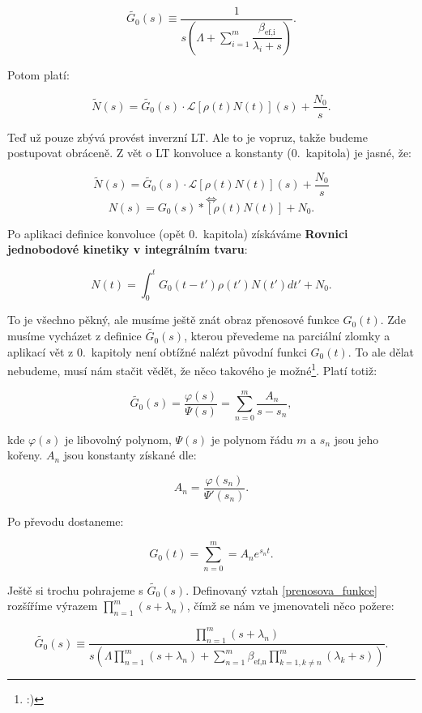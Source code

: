 \begin{equation}
  \boxed{
  \tilde{G_0}(s) \equiv \dfrac{1}{s \left ( \Lambda + \sum_{i=1}^m \dfrac{\beta_{\text{ef,i}}}{\lambda_i + s} \right )}.
  \label{prenosova_funkce}
  }
\end{equation}

Potom platí:

$$ \tilde{N}(s) = \tilde{G_0}(s) \cdot \mathcal{L}[\rho(t) N(t)](s) + \dfrac{N_0}{s}. $$

Teď už pouze zbývá provést inverzní LT. Ale to je vopruz, takže budeme postupovat obráceně. Z vět o LT konvoluce a konstanty (0.~kapitola) je jasné, že:

$$ \tilde{N}(s) = \tilde{G_0}(s) \cdot \mathcal{L}[\rho(t) N(t)](s) + \dfrac{N_0}{s} $$
$$ \Leftrightarrow $$
$$ N(s) = G_0(s) * [\rho(t) N(t)] + N_0. $$

Po aplikaci definice konvoluce (opět 0.~kapitola) získáváme \textbf{Rovnici jednobodové kinetiky v integrálním tvaru}:

\begin{equation}
  \boxed{
  N(t) = \int_0^t G_0(t-t') \rho(t') N(t')dt' + N_0.
  \label{integralni_kinetika}
  }
\end{equation}

To je všechno pěkný, ale musíme ještě znát obraz přenosové funkce $G_0(t)$. Zde musíme vycházet z definice $\tilde{G_0}(s)$, kterou převedeme na parciální zlomky a aplikací vět z 0.~kapitoly není obtížné nalézt původní funkci $G_0(t)$. To ale dělat nebudeme, musí nám stačit vědět, že něco takového je možné\footnote{:)}. Platí totiž:

$$ \tilde{G_0}(s) = \dfrac{\varphi(s)}{\Psi(s)} = \sum_{n=0}^m \dfrac{A_n}{s-s_n}, $$

kde $\varphi(s)$ je libovolný polynom, $\Psi(s)$ je polynom řádu $m$ a $s_n$ jsou jeho kořeny. $A_n$ jsou konstanty získané dle:

$$ A_n = \dfrac{\varphi(s_n)}{\Psi'(s_n)}. $$

Po převodu dostaneme:

$$ G_0(t) = \sum_{n=0}^m = A_n e^{s_n t}. $$

Ještě si trochu pohrajeme s $\tilde{G_0}(s)$. Definovaný vztah \eqref{prenosova_funkce} rozšíříme výrazem $\prod_{n=1}^m (s+\lambda_n)$, čímž se nám ve jmenovateli něco požere:

$$ \tilde{G_0}(s) \equiv \dfrac{\prod_{n=1}^m (s+\lambda_n)}{s \left ( \Lambda \prod_{n=1}^m (s+\lambda_n)  + \sum_{n=1}^m \beta_{\text{ef,n}}\prod_{k=1, k \neq n}^m(\lambda_k + s) \right )}. $$

